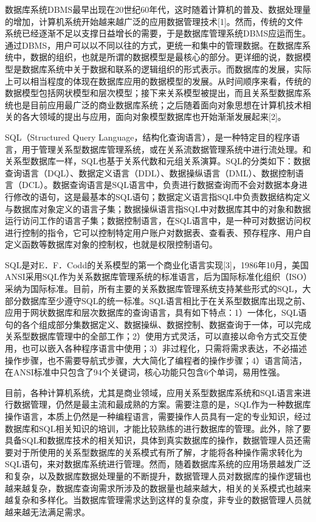 数据库系统DBMS最早出现在20世纪60年代，这时随着计算机的普及、数据处理量的增加，计算机系统开始越来越广泛的应用数据管理技术[1]。然而，传统的文件系统已经逐渐不足以支撑日益增长的需要，于是数据库管理系统DBMS应运而生。通过DBMS，用户可以以不同以往的方式，更统一和集中的管理数据。在数据库系统中，数据的组织，也就是所谓的数据模型是最核心的部分。更详细的说，数据模型是数据库系统中关于数据和联系的逻辑组织的形式表示。而数据库的发展，实际上可以相当程度的体现在数据库应用的数据模型的发展。从时间顺序来看，传统的数据模型包括网状模型和层次模型；接下来关系模型被提出，而且关系型数据库系统也是目前应用最广泛的商业数据库系统；之后随着面向对象思想在计算机技术相关的各大领域的提出与应用，面向对象模型数据库也开始渐渐发展起来[2]。

SQL（Structured Query Language，结构化查询语言），是一种特定目的程序语言，用于管理关系型数据库管理系统，或在关系流数据管理系统中进行流处理。和关系型数据库一样，SQL也基于关系代数和元组关系演算。SQL的分类如下：数据查询语言（DQL）、数据定义语言（DDL）、数据操纵语言（DML）、数据控制语言（DCL）。数据查询语言是SQL语言中，负责进行数据查询而不会对数据本身进行修改的语句，这是最基本的SQL语句；数据定义语言指SQL中负责数据结构定义与数据库对象定义的语言子集；数据操纵语言指SQL中对数据库其中的对象和数据运行访问工作的语言子集；数据控制语言，在SQL语言中，是一种可对数据访问权进行控制的指令，它可以控制特定用户账户对数据表、查看表、预存程序、用户自定义函数等数据库对象的控制权，也就是权限控制语句。

SQL是对E．F．Codd的关系模型的第一个商业化语言实现[3]，1986年10月，美国ANSI采用SQL作为关系数据库管理系统的标准语言，后为国际标准化组织（ISO）采纳为国际标准。目前，所有主要的关系数据库管理系统支持某些形式的SQL，大部分数据库至少遵守SQL的统一标准。SQL语言相比于在关系型数据库出现之前、应用于网状数据库和层次数据库的查询语言，具有如下特点：1）一体化，SQL语句的各个组成部分集数据定义、数据操纵、数据控制、数据查询于一体，可以完成关系型数据库管理中的全部工作；2）使用方式灵活，可以直接以命令方式交互使用，也可以嵌入各种程序语言中使用；3）非过程化，只需将需求表达，不必描述操作步骤，也不需要导航式步骤，大大简化了编程者的操作步骤；4）语言简洁，在ANSI标准中只包含了94个关键词，核心功能只包含6个单词，易用性强。

目前，各种计算机系统，尤其是商业领域，应用关系型数据库系统和SQL语言来进行数据管理，仍然是最主流和最成熟的方案。需要注意的是，SQL作为一种数据库操作语言，本质上仍然是一种编程语言，需要操作人员具有一定的专业知识，经过数据库和SQL相关知识的培训，才能比较熟练的进行数据库的管理。此外，除了要具备SQL和数据库技术的相关知识，具体到真实数据库的操作，数据管理人员还需要对于所使用的关系型数据库的关系模式有所了解，才能将各种操作需求转化为SQL语句，来对数据库系统进行管理。然而，随着数据库系统的应用场景越发广泛和复杂，以及数据库数据处理量的不断提升，数据管理人员对数据库的操作逻辑也越来越复杂，数据库查询需求所涉及的数据量也越来越大，相关的关系模式也越来越复杂和多样化。当数据库管理需求达到这样的复杂度，非专业的数据管理人员就越来越无法满足需求。

